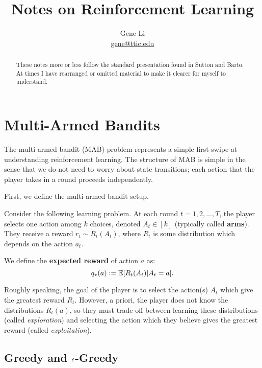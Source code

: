 \documentclass{article}
\title{Notes on Reinforcement Learning}
\author{Gene Li\\ \url{gene@ttic.edu}}
\begin{document}
\maketitle
\begin{abstract}
    These notes more or less follow the standard presentation found in Sutton and Barto. At times I have rearranged or omitted material to make it clearer for myself to understand.
\end{abstract}

\setcounter{section}{1}

\section{Multi-Armed Bandits}
The multi-armed bandit (MAB) problem represents a simple first swipe at understanding reinforcement learning. The structure of MAB is simple in the sense that we do not need to worry about state transitions; each action that the player takes in a round proceeds independently.

First, we define the multi-armed bandit setup.

\begin{definition}
    Consider the following learning problem. At each round $t=1,2,...,T$, the player selects one action among $k$ choices, denoted $A_t \in [k]$ (typically called \textbf{arms}). They receive a reward $r_t \sim R_t(A_t)$, where $R_t$ is some distribution which depends on the action $a_t$. 
    
    We define the \textbf{expected reward} of action $a$ as:
    \begin{equation}
        q_\star(a) := \operatorname*{\mathbb{E}}[R_t(A_t)|A_t = a].
    \end{equation}
\end{definition}

Roughly speaking, the goal of the player is to select the action(s) $A_t$ which give the greatest reward $R_t$. However, a priori, the player does not know the distributions $R_t(a)$, so they must trade-off between learning these distributions (called \textit{exploration}) and selecting the action which they believe gives the greatest reward (called \textit{exploitation}).

\subsection{Greedy and $\epsilon$-Greedy}
\end{document}
